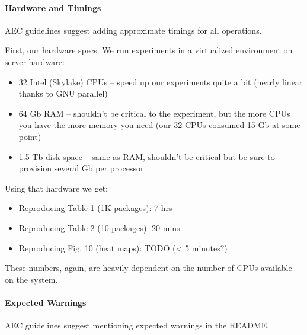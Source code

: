 \documentclass[
]{article}
\providecommand{\tightlist}{%
  \setlength{\itemsep}{0pt}\setlength{\parskip}{0pt}}
\begin{document}
\hypertarget{hardware-and-timings}{%
\paragraph{Hardware and Timings}\label{hardware-and-timings}}

AEC guidelines suggest adding approximate timings for all operations.

First, our hardware specs. We run experiments in a virtualized
environment on server hardware:

\begin{itemize}
\item
  32 Intel (Skylake) CPUs -- speed up our experiments quite a bit
  (nearly linear thanks to GNU parallel)
\item
  64 Gb RAM -- shouldn't be critical to the experiment, but the more
  CPUs you have the more memory you need (our 32 CPUs consumed 15 Gb at
  some point)
\item
  1.5 Tb disk space -- same as RAM, shouldn't be critical but be sure to
  provision several Gb per processor.
\end{itemize}

Using that hardware we get:

\begin{itemize}
\tightlist
\item
  Reproducing Table 1 (1K packages): 7 hrs
\item
  Reproducing Table 2 (10 packages): 20 mins
\item
  Reproducing Fig. 10 (heat maps): TODO (\textless{} 5 minutes?)
\end{itemize}

These numbers, again, are heavily dependent on the number of CPUs
available on the system.

\hypertarget{expected-warnings}{%
\paragraph{Expected Warnings}\label{expected-warnings}}

AEC guidelines suggest mentioning expected warnings in the README.
\end{document}
